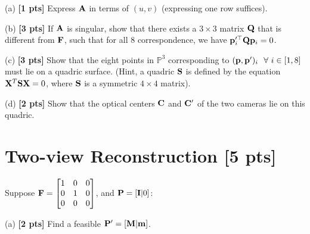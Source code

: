 \begin{questions}
    (a) \textbf{[1 pts]} Express $\mathbf{A}$ in terms of $(u, v)$ (expressing one row suffices).

    \begin{tcolorbox}[fit,height=3cm, width=\linewidth, blank, borderline={0.5pt}{-2pt},halign=center, nobeforeafter]
    \end{tcolorbox}

    (b) \textbf{[3 pts]} If $\mathbf{A}$ is singular, show that there exists a $3 \times 3$ matrix $\mathbf{Q}$ that is different from $\mathbf{F}$, such that for all $8$ correspondence, we have $\mathbf{p}_i^{\prime\top} \mathbf{Q} \mathbf{p}_i = 0$.

    \begin{tcolorbox}[fit,height=4cm, width=\linewidth, blank, borderline={0.5pt}{-2pt},halign=center, nobeforeafter]
    \end{tcolorbox}

    \clearpage

    (c) \textbf{[3 pts]} Show that the eight points in $\mathbb{P}^3$ corresponding to $(\mathbf{p}, \mathbf{p}^\prime)_i~~\forall~ i \in [1, 8]$ must lie on a quadric surface. (Hint, a quadric $\mathbf{S}$ is defined by the equation $\mathbf{X}^T\mathbf{S}\mathbf{X} = 0$, where $\mathbf{S}$ is a symmetric $4 \times 4$ matrix).

    \begin{tcolorbox}[fit,height=4cm, width=\linewidth, blank, borderline={0.5pt}{-2pt},halign=center, nobeforeafter]
    \end{tcolorbox}

    (d) \textbf{[2 pts]} Show that the optical centers $\mathbf{C}$ and $\mathbf{C}^\prime$ of the two cameras lie on this quadric.

    \begin{tcolorbox}[fit,height=4cm, width=\linewidth, blank, borderline={0.5pt}{-2pt},halign=center, nobeforeafter]
    \end{tcolorbox}

    \section{Two-view Reconstruction [5 pts]}

    \question  Suppose $\mathbf{F} = \begin{bmatrix}
            1 & 0 & 0 \\
            0 & 1 & 0 \\
            0 & 0 & 0
        \end{bmatrix}$, and $\mathbf{P} =[\mathbf{I} | 0 ]$:

    (a) \textbf{[2 pts]} Find a feasible $\mathbf{P}' = [\mathbf{M} | \mathbf{m}]$.


\end{questions}
